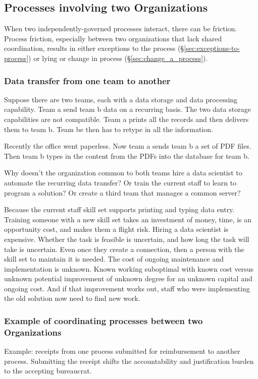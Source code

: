 \subsection{Processes involving two Organizations}

When two independently-governed processes interact, there can be friction. Process friction, especially between two  organizations that lack shared coordination, results in either exceptions to the process (\S\ref{sec:exceptions-to-process}) or lying or change in process (\S\ref{sec:change_a_process}). 

\subsubsection{Data transfer from one team to another}

Suppose there are two teams, each with a data storage and data processing capability. Team a send team b data on a recurring basis. The two data storage capabilities are not compatible. Team a prints all the records and then delivers them to team b. Team be then has to retype in all the information.

Recently the office went paperless. Now team a sends team b a set of PDF files. Then team b types in the content from the PDFs into the database for team b.

Why doesn't the organization common to both teams hire a data scientist to automate the recurring data transfer? Or train the current staff to learn to program a solution? Or create a third team that manages a common server?

Because the current staff skill set supports printing and typing data entry. Training someone with a new skill set takes an investment of money, time, is an opportunity cost, and makes them a flight risk.
Hiring a data scientist is expensive. Whether the task is feasible is uncertain, and how long the task will take is uncertain. Even once they create a connection, then a person with the skill set to maintain it is needed. The cost of ongoing maintenance and implementation is unknown.
Known working suboptimal with known cost versus unknown potential improvement of unknown degree for an unknown capital and ongoing cost. And if that improvement works out, staff who were implementing the old solution now need to find new work.

\subsubsection{Example of coordinating processes between two Organizations}
Example: receipts from one process submitted for reimbursement to another process.
Submitting the receipt shifts the accountability and justification burden to the accepting bureaucrat.



